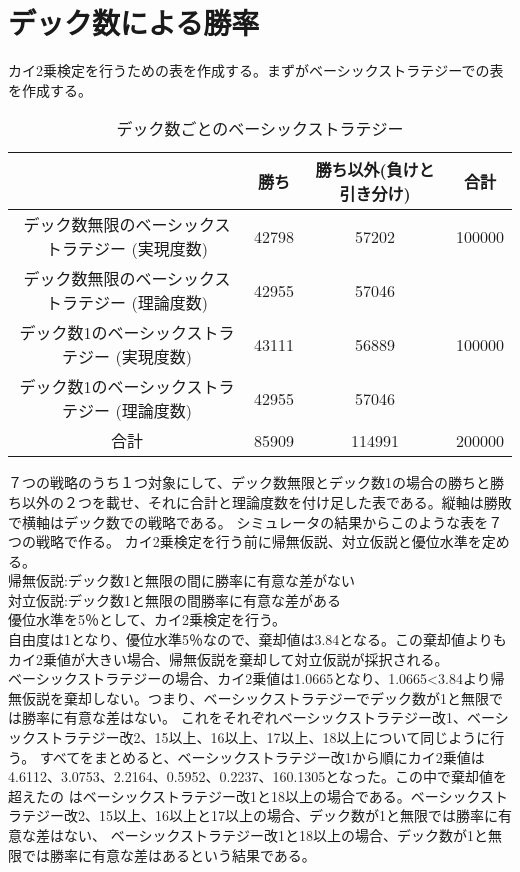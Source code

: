 \section{デック数による勝率}
カイ2乗検定を行うための表を作成する。まずがベーシックストラテジーでの表を作成する。
\begin{table}[H]
 \begin{center}
  \begin{tabular}{|c|c|c|c|}
    \hline
      & 勝ち & 勝ち以外(負けと引き分け) & 合計 \\
    \hline デック数無限のベーシックストラテジー (実現度数)& 42798 & 57202 & 100000 \\
            デック数無限のベーシックストラテジー (理論度数)& 42955 & 57046 &  \\
    \hline デック数1のベーシックストラテジー (実現度数)& 43111 & 56889 & 100000 \\
            デック数1のベーシックストラテジー (理論度数)& 42955 & 57046 &  \\
    \hline  合計 & 85909 & 114991 & 200000 \\
    \hline
  \end{tabular}
 \end{center}
 \caption{デック数ごとのベーシックストラテジー}
\end{table}
７つの戦略のうち１つ対象にして、デック数無限とデック数1の場合の勝ちと勝ち以外の２つを載せ、それに合計と理論度数を付け足した表である。縦軸は勝敗で横軸はデック数での戦略である。
シミュレータの結果からこのような表を７つの戦略で作る。
カイ2乗検定を行う前に帰無仮説、対立仮説と優位水準を定める。\\
帰無仮説:デック数1と無限の間に勝率に有意な差がない\\
対立仮説:デック数1と無限の間勝率に有意な差がある\\
優位水準を5％として、カイ2乗検定を行う。\\
自由度は1となり、優位水準5％なので、棄却値は3.84となる。この棄却値よりもカイ2乗値が大きい場合、帰無仮説を棄却して対立仮説が採択される。\\
ベーシックストラテジーの場合、カイ2乗値は1.0665となり、1.0665<3.84より帰無仮説を棄却しない。つまり、ベーシックストラテジーでデック数が1と無限では勝率に有意な差はない。
これをそれぞれベーシックストラテジー改1、ベーシックストラテジー改2、15以上、16以上、17以上、18以上について同じように行う。
すべてをまとめると、ベーシックストラテジー改1から順にカイ2乗値は4.6112、3.0753、2.2164、0.5952、0.2237、160.1305となった。この中で棄却値を超えたの
はベーシックストラテジー改1と18以上の場合である。ベーシックストラテジー改2、15以上、16以上と17以上の場合、デック数が1と無限では勝率に有意な差はない、
ベーシックストラテジー改1と18以上の場合、デック数が1と無限では勝率に有意な差はあるという結果である。
